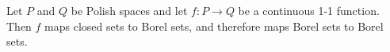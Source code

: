 Let $P$ and $Q$ be Polish spaces and let $f: P \to Q$ be a continuous 1-1 function. Then $f$ maps closed sets to Borel sets, and therefore maps Borel sets to Borel sets.
